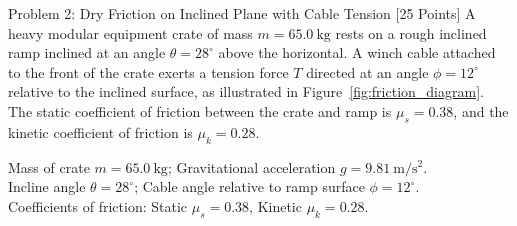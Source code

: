 \documentclass[11pt, a4paper, titlepage=false]{scrartcl}
\begin{document}
\begin{problembox}{Problem 2: Dry Friction on Inclined Plane with Cable Tension \hfill [25 Points]}
    A heavy modular equipment crate of mass $m = \SI{65.0}{\kilogram}$ rests on a rough inclined ramp inclined at an angle $\theta = 28^\circ$ above the horizontal. A winch cable attached to the front of the crate exerts a tension force $T$ directed at an angle $\phi = 12^\circ$ relative to the inclined surface, as illustrated in Figure~\ref{fig:friction_diagram}. The static coefficient of friction between the crate and ramp is $\mu_s = 0.38$, and the kinetic coefficient of friction is $\mu_k = 0.28$.

    \begin{givenbox}
        Mass of crate $m = \SI{65.0}{\kilogram}$; Gravitational acceleration $g = \SI{9.81}{\meter\per\second\squared}$.\\
        Incline angle $\theta = 28^\circ$; Cable angle relative to ramp surface $\phi = 12^\circ$.\\
        Coefficients of friction: Static $\mu_s = 0.38$, Kinetic $\mu_k = 0.28$.
    \end{givenbox}

    \begin{center}
\end{center}
\end{problembox}
\end{document}
